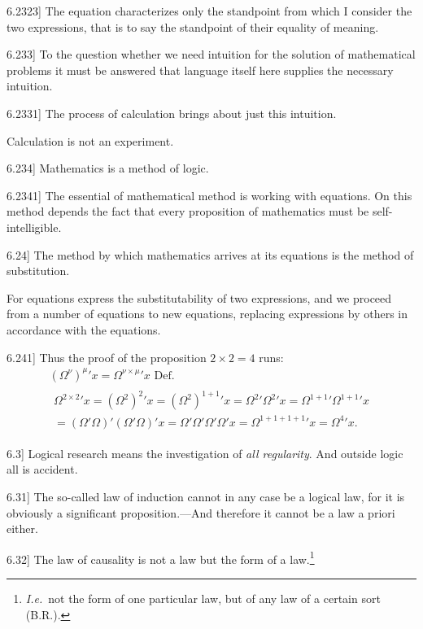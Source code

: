 \documentclass[12pt,oneside]{book}[2007/10/19]
\newcommand{\PropositionE}[2]{%
  \item[\phantomsection\label{PropE:#1}\PropGRef{#1}] #2%
}
\newcommand{\PropGRef}[1]{\hyperref[PropG:#1]{#1}}
\newcommand{\IdEst}{\textit{I.e.}}
\begin{document}
\begin{propositions}
\PropositionE{6.2323}
{The equation characterizes only the standpoint
from which I consider the two expressions, that
is to say the standpoint of their equality of
meaning.}


\PropositionE{6.233}
{To the question whether we need intuition for
the solution of mathematical problems it must be
answered that language itself here supplies the
necessary intuition.}


\PropositionE{6.2331}
{The process of calculation brings about just
this intuition.

Calculation is not an experiment.}


\PropositionE{6.234}
{Mathematics is a method of logic.}


\PropositionE{6.2341}
{The essential of mathematical method is working
with equations. On this method depends the
fact that every proposition of mathematics must
be self-intelligible.}


\PropositionE{6.24}
{The method by which mathematics arrives at
its equations is the method of substitution.

For equations express the substitutability of
two expressions, and we proceed from a number
of equations to new equations, replacing expressions
by others in accordance with the
equations.}


\PropositionE{6.241}
{Thus the proof of the proposition $2 \times 2 = 4$ runs:
\begin{gather*}
(\Omega^{\nu})^{\mu}{}'x = \Omega^{\nu \times \mu}{}'x \text{ Def.}\\
\begin{split}
\Omega^{2 \times 2}{}'x = (\Omega^{2})^{2}{}'x = (\Omega^{2})^{1 + 1}{}'x = \Omega^{2}{}'\Omega^{2}{}'x = \Omega^{1 + 1}{}'\Omega^{1 + 1}{}'x\\
= (\Omega'\Omega)'(\Omega'\Omega)'x = \Omega'\Omega'\Omega'\Omega'x = \Omega^{1 + 1 + 1 + 1}{}'x = \Omega^{4}{}'x.
\end{split}
\end{gather*}}


\PropositionE{6.3}
{Logical research means the investigation of \emph{all
\enlargethispage{2pt} %
regularity}. And outside logic all is accident.}


\PropositionE{6.31}
{The so-called law of induction cannot in any
case be a logical law, for it is obviously a significant
proposition.---And therefore it cannot be
a law a priori either.}


\PropositionE{6.32}
{The law of causality is not a law but the form
of a law.\footnote{\IdEst\ not the form of one particular law, but of any law of a certain
sort (B.\;R.).}}



\end{propositions}
\end{document}
